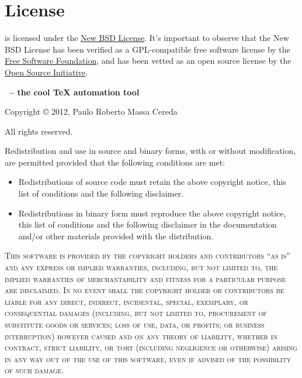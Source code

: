 \documentclass[a4paper,twoside,12pt]{memoir}
\begin{document}
\cleardoublepage

\section*{License}
\label{sec:license}

\arara is licensed under the 
\href{http://www.opensource.org/licenses/bsd-license.php}{New BSD License}. It's
important to observe that the New BSD License has been verified as a 
GPL-compatible free software license by the 
\href{http://www.fsf.org/}{Free Software Foundation}, and has been vetted as an 
open source license by the 
\href{http://www.opensource.org/}{Open Source Initiative}.

\vfill

\begin{infobox}[skipabove=\baselineskip plus 2pt minus 1pt]
\noindent
\begingroup
  \color{araracolor}\bfseries
  \arara \ -- the cool \TeX{} automation tool
\endgroup

\vspace{.5em}

\noindent Copyright \copyright{} 2012, Paulo Roberto Massa Cereda

\noindent All rights reserved.

\vspace{1em}

\noindent Redistribution and use in source and binary forms, with or without
modification, are permitted provided that the following conditions are met:

\vspace{1em}

\begin{itemize}
\item Redistributions of source code must retain the above copyright notice, 
      this list of conditions and the following disclaimer.
\item Redistributions in binary form must reproduce the above copyright notice,
      this list of conditions and the following disclaimer in the documentation
      and/or other materials provided with the distribution.
\end{itemize}

\vspace{1em}

\noindent\textsc{This software is provided by the copyright holders and 
contributors ``as is'' and any express or implied warranties, including, but not
 limited to, the implied warranties of merchantability and fitness for a 
particular purpose are disclaimed. In no event shall the copyright holder or 
contributors be liable for any direct, indirect, incidental, special, exemplary,
 or consequential damages (including, but not limited to, procurement of 
substitute goods or services; loss of use, data, or profits; or business 
interruption) however caused and on any theory of liability, whether in contract,
 strict liability, or tort (including negligence or otherwise) arising in any 
way out of the use of this software, even if advised of the possibility of such
damage.}
\end{infobox}
\end{document}

